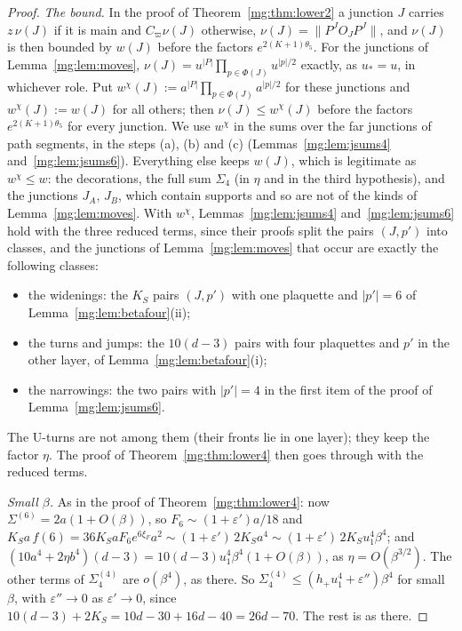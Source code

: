 \documentclass[11pt,a4paper]{article}
\theoremstyle{definition}
\theoremstyle{remark}
\newcommand{\norm}[1]{\lVert #1\rVert}
\begin{document}
\begin{proof}
\emph{The bound.} In the proof of Theorem~\ref{mg:thm:lower2} a junction $J$ carries $z\,\nu(J)$ if it is main and $C_\varpi\nu(J)$ otherwise, $\nu(J)=\norm{P^JO_JP^J}$, and
$\nu(J)$ is then bounded by $w(J)$ before the factors $e^{2(K+1)\theta_5}$. For the junctions of Lemma~\ref{mg:lem:moves}, $\nu(J)=u^{|P|}\prod_{p\in\Phi(J)}u^{|p|/2}$ exactly, as
$u_*=u$, in whichever role. Put $w^\chi(J):=a^{|P|}\prod_{p\in\Phi(J)}a^{|p|/2}$ for these junctions and $w^\chi(J):=w(J)$ for all others; then $\nu(J)\le w^\chi(J)$ before the factors
$e^{2(K+1)\theta_5}$ for every junction. We use $w^\chi$ in the sums over the far junctions of path segments, in the steps (a), (b) and (c) (Lemmas~\ref{mg:lem:jsums4}
and~\ref{mg:lem:jsums6}). Everything else keeps $w(J)$, which is legitimate as $w^\chi\le w$: the decorations, the full sum $\Sigma_4$ (in $\eta$ and in the third
hypothesis), and the junctions $J_A$, $J_B$, which contain supports and so are not of the kinds of Lemma~\ref{mg:lem:moves}. With $w^\chi$, Lemmas~\ref{mg:lem:jsums4}
and~\ref{mg:lem:jsums6} hold with the three reduced terms, since their proofs split the pairs $(J,p')$ into classes, and the junctions of Lemma~\ref{mg:lem:moves} that occur
are exactly the following classes:
\begin{itemize}
\item the widenings: the $K_S$ pairs $(J,p')$ with one plaquette and $|p'|=6$ of Lemma~\ref{mg:lem:betafour}(ii);
\item the turns and jumps: the $10(d-3)$ pairs with four plaquettes and $p'$ in the other layer, of Lemma~\ref{mg:lem:betafour}(i);
\item the narrowings: the two pairs with $|p'|=4$ in the first item of the proof of Lemma~\ref{mg:lem:jsums6}.
\end{itemize}
The U-turns are not among them (their fronts lie in one layer); they keep the factor $\eta$. The proof of Theorem~\ref{mg:thm:lower4} then goes through with the
reduced terms.

\emph{Small $\beta$.} As in the proof of Theorem~\ref{mg:thm:lower4}: now $\Sigma^{(6)}=2a(1+O(\beta))$, so $F_6\sim(1+\varepsilon')a/18$ and
$K_Sa\,f(6)=36K_SaF_6e^{6\xi_F}a^2\sim(1+\varepsilon')\,2K_Sa^4\sim(1+\varepsilon')\,2K_Su_1^4\beta^4$; and $(10a^4+2\eta b^4)(d-3)=10(d-3)u_1^4\beta^4(1+O(\beta))$, as $\eta=O(\beta^{3/2})$. The other
terms of $\Sigma^{(4)}_4$ are $o(\beta^4)$, as there. So $\Sigma^{(4)}_4\le(h_+u_1^4+\varepsilon'')\beta^4$ for small $\beta$, with $\varepsilon''\to0$ as $\varepsilon'\to0$, since
$10(d-3)+2K_S=10d-30+16d-40=26d-70$. The rest is as there.
\end{proof}
\end{document}
